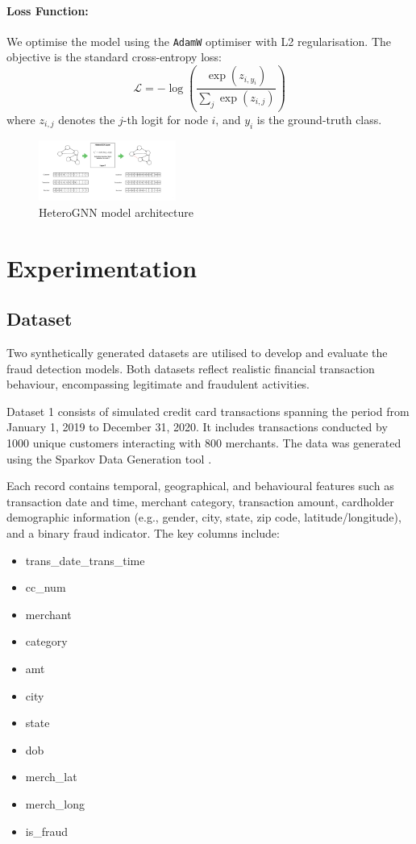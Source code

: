 \documentclass[conference]{IEEEtran}
\begin{document}
\paragraph{Loss Function:}
We optimise the model using the \texttt{AdamW} optimiser with L2 regularisation. The objective is the standard cross-entropy loss:
\begin{equation}
    \mathcal{L} = -\log \left( \frac{\exp(z_{i,y_i})}{\sum_{j} \exp(z_{i,j})} \right)
    \label{eq:crossentropy}
\end{equation}
where $z_{i,j}$ denotes the $j$-th logit for node $i$, and $y_i$ is the ground-truth class.

\begin{figure}[htbp]
    \centering
    \includegraphics[width=0.4\textwidth, keepaspectratio]{Model_arch.pdf}
    \caption{HeteroGNN model architecture}
    \label{fig:gnn-layer}
\end{figure}

\section{Experimentation}
\subsection{Dataset}
Two synthetically generated datasets are utilised to develop and evaluate the fraud detection models. Both datasets reflect realistic financial transaction behaviour, encompassing legitimate and fraudulent activities.

Dataset 1 consists of simulated credit card transactions spanning the period from January 1, 2019 to December 31, 2020. It includes transactions conducted by 1000 unique customers interacting with 800 merchants. The data was generated using the Sparkov Data Generation tool \cite{dataset1}.

Each record contains temporal, geographical, and behavioural features such as transaction date and time, merchant category, transaction amount, cardholder demographic information (e.g., gender, city, state, zip code, latitude/longitude), and a binary fraud indicator. The key columns include:
\begin{itemize}
    \item trans\_date\_trans\_time
    \item cc\_num
    \item merchant
    \item category
    \item amt
    \item city
    \item state
    \item dob
    \item merch\_lat
    \item merch\_long
    \item is\_fraud
\end{itemize}
\end{document}
